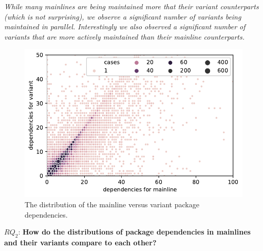 \begin{framed}
\noindent
\emph{While many mainlines are being maintained more that their variant counterparts (which is not surprising), we  observe a significant number of variants being maintained in parallel. Interestingly we also observed a significant number of variants that are more actively maintained than their mainline counterparts.}
\end{framed}

\begin{figure}[htbp]
\vspace{-.3cm}
   \centering
    \includegraphics[scale=0.6]{figures/benevolj_dependencies.pdf}
    \caption{The distribution of the mainline versus variant package dependencies.}
    \label{fig:dependencies}
\end{figure}


$RQ_2$: \textbf{How do the distributions of package dependencies in mainlines and their variants compare to each other?}

